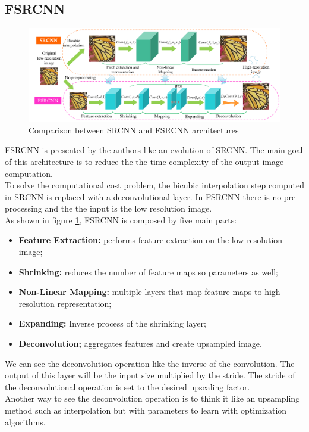 \documentclass[10pt,twocolumn,letterpaper]{article}
\begin{document}
\subsection{FSRCNN}
\begin{figure}[]
	\centering
	\includegraphics[width=\textwidth]{img/fsrcnn.png}
	\caption{Comparison between SRCNN and FSRCNN architectures \cite{dong2014image}}
	\label{fsrcnn}
\end{figure}
FSRCNN is presented by the authors like an evolution of SRCNN. The main goal of this architecture is to reduce the the time complexity of the output image computation.\\
To solve the computational cost problem, the bicubic interpolation step computed in SRCNN is replaced with a deconvolutional layer. In FSRCNN there is no pre-processing and the the input is the low resolution image.\\
As shown in figure \ref{fsrcnn}, FSRCNN is composed by five main parts:
\begin{itemize}
	\item \textbf{Feature Extraction:} performs feature extraction on the low resolution image;
	\item \textbf{Shrinking:} reduces the number of feature maps so parameters as well;
	 \item \textbf{Non-Linear Mapping:} multiple layers that map feature maps to high resolution  representation;
	\item \textbf{Expanding:} Inverse process of the shrinking layer;
	\item \textbf{Deconvolution;} aggregates features and create upsampled image.
\end{itemize}
We can see the deconvolution operation like the inverse of the convolution. The output of this layer will be the input size multiplied by the stride.  The stride of the deconvolutional operation is set to the desired upscaling factor.\\
Another way to see the deconvolution operation is to think it like an upsampling method such as interpolation but with parameters to learn with optimization algorithms.\\
\end{document}
